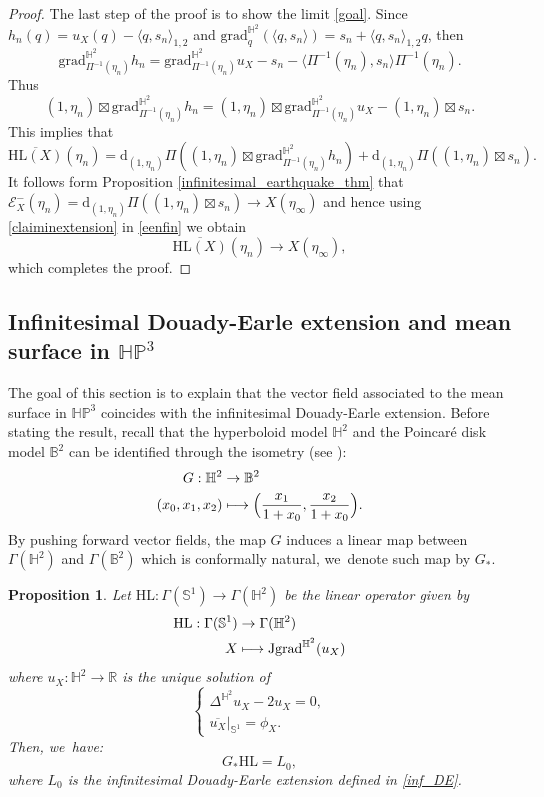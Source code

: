 \documentclass[10pt]{amsart}
\newcommand\mto{\mathchoice{\longmapsto}{\mapsto}{\mapsto}{\mapsto}}
\theoremstyle{plain}
\newtheorem{prop}[cor]{Proposition}
\theoremstyle{definition}
\newcommand{\HP}{\mathbb{HP}^3}
\newcommand{\grad}{\mathrm{grad}^{\mathbb{H}^2}}
\newcommand{\J}{\mathrm{J}}
\newcommand{\inner}[1] {\langle #1 \rangle}
\let\Subsection\subsection\let\Subsubsection\subsubsection
\begin{document}
\begin{proof}
The last step of the proof is to show the limit \eqref{goal}. Since $h_n(q)=u_X(q)-\inner{q,s_n}_{1,2}$ and $\grad_q(\inner{q,s_n})=s_n+\inner{q,s_n}_{1,2}q$, then
\[
\grad_{\Pi^{-1}(\eta_n)}h_n=\grad_{\Pi^{-1}(\eta_n)}u_X-s_n-\inner{\Pi^{-1}(\eta_n),s_n}\Pi^{-1}(\eta_n).
\]
Thus
\[
(1,\eta_n)\boxtimes\grad_{\Pi^{-1}(\eta_n)}h_n=(1,\eta_n)\boxtimes\grad_{\Pi^{-1}(\eta_n)}u_X-(1,\eta_n)\boxtimes s_n.
\]
This implies that
\begin{equation}\label{eenfin}
\overline{\mathrm{HL}(X)}(\eta_n)=\mathrm{d}_{(1,\eta_n)}\Pi\left((1,\eta_n)\boxtimes\grad_{\Pi^{-1}(\eta_n)} h_n \right)+\mathrm{d}_{(1,\eta_n)}\Pi((1,\eta_n)\boxtimes s_n).
\end{equation}
It follows form Proposition \ref{infinitesimal_earthquake_thm} that $ \mathcal{E}^-_X(\eta_n)=\mathrm{d}_{(1,\eta_n)}\Pi\left((1,\eta_n)\boxtimes s_n\right)\to X(\eta_{\infty})$ and hence using \eqref{claiminextension} in \eqref{eenfin} we obtain
\[
\overline{\mathrm{HL}(X)}(\eta_n)\to X(\eta_{\infty}),
\]
which completes the proof.
\end{proof}

\Subsection{Infinitesimal Douady-Earle extension and mean surface in \texorpdfstring{$\HP$}{HP}}
The goal of this section is to explain that the vector field associated to the mean surface in $\HP$ coincides with the infinitesimal Douady-Earle extension. Before stating the result, recall that the hyperboloid model $\mathbb{H}^2$ and the Poincaré disk model $\mathbb{B}^2$ can be identified through the isometry (see \cite[Chap.\,2]{martelli2022introduction}):
\begin{equation}\label{H2_to_B2}
\begin{aligned}
G : \mathbb{H}^2 & \to \mathbb{B}^2 \\
(x_0,x_1,x_2) & \mto \Bigl(\frac{x_1}{1+x_0}, \frac{x_2}{1+x_0}\Bigr).
\end{aligned}
\end{equation}
By pushing forward vector fields, the map $G$ induces a linear map between $\Gamma(\mathbb{H}^2)$ and $\Gamma(\mathbb{B}^2)$ which is conformally natural, we~denote such map by $G_*$.
\begin{prop}\label{HL_DE}
Let $\mathrm{HL}:\Gamma(\mathbb{S}^1)\to\Gamma(\mathbb{H}^2)$ be the linear operator given by
\[
\begin{aligned}
\mathrm{HL}: \Gamma(\mathbb{S}^1) & \to \Gamma(\mathbb{H}^2) \\
X & \mto\J\grad(u_X)
\end{aligned}
\]
where $u_X:\mathbb{H}^2\to\mathbb{R}$ is the unique solution of
\begin{equation}\label{platau_HPX}
\begin{cases}
\Delta^{\mathbb{H}^2} u_X-2u_X=0, \\
\overline{u_X}|_{\mathbb{S}^1}=\phi_X.
\end{cases}\end{equation}
Then, we~have:
\[
G_*\mathrm{HL}=L_0,
\]
where $L_0$ is the infinitesimal Douady-Earle extension defined in \eqref{inf_DE}.
\end{prop}
\end{document}
